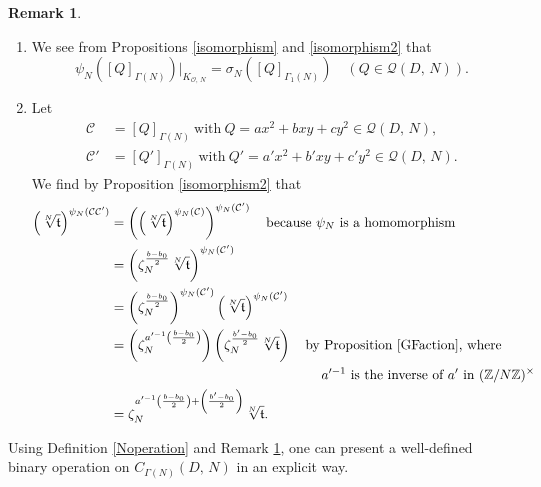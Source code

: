 \documentclass[reqno,11pt]{article}
\theoremstyle{plain} %
\theoremstyle{definition} %
\newtheorem{remark}[theorem]{\indent\sc Remark}
\begin{document}
\begin{remark}\label{operationremark}
\begin{enumerate}
\item[(i)] We see from Propositions \ref{isomorphism} and \ref{isomorphism2} that
\begin{equation*}
\psi_N([Q]_{\Gamma(N)})|_{K_{\mathcal{O},\,N}}=\sigma_N
([Q]_{\Gamma_1(N)})\quad(Q\in\mathcal{Q}(D,\,N)). 
\end{equation*}
\item[(ii)] Let 
\begin{align*}
\mathcal{C}&=[Q]_{\Gamma(N)}~\textrm{with}~
Q=ax^2+bxy+cy^2\in\mathcal{Q}(D,\,N),\\
\mathcal{C}'&=[Q']_{\Gamma(N)}~\textrm{with}~
Q'=a'x^2+b'xy+c'y^2\in\mathcal{Q}(D,\,N).
\end{align*}
We find by Proposition \ref{isomorphism2} that
\begin{align*}
\left(\sqrt[N]{\mathfrak{t}}\right)^{\psi_N(\mathcal{C}\mathcal{C}')}&=
\left(\left(\sqrt[N]{\mathfrak{t}}\right)^{\psi_N(\mathcal{C})}\right)
^{\psi_N(\mathcal{C}')}\quad\textrm{because $\psi_N$ is a homomorphism}\\
&=\left(\zeta_N^{\frac{b-b_0}{2}}\sqrt[N]{\mathfrak{t}}\right)
^{\psi_N(\mathcal{C}')}\\
&=\left(\zeta_N^{\frac{b-b_0}{2}}\right)^{\psi_N(\mathcal{C}')}\left(\sqrt[N]{\mathfrak{t}}\right)
^{\psi_N(\mathcal{C}')}\\
&=\left(\zeta_N^{a'^{-1}\left(\frac{b-b_0}{2}\right)}\right)
\left(\zeta_N^{\frac{b'-b_0}{2}}\sqrt[N]{\mathfrak{t}}\right)
\quad\textrm{by Proposition \ref{GFaction}, where}\\
&\hspace{5.5cm}\textrm{$a'^{-1}$ is the inverse of $a'$ in $(\mathbb{Z}/N\mathbb{Z})^\times$}\\
&=\zeta_N^{a'^{-1}\left(\frac{b-b_0}{2}\right)+\left(\frac{b'-b_0}{2}\right)}\sqrt[N]{\mathfrak{t}}. 
\end{align*}
\end{enumerate}
\end{remark}

Using Definition \ref{Noperation} and Remark \ref{operationremark}, one can present
a well-defined binary operation on $C_{\Gamma(N)}(D,\,N)$ in an explicit way. 
\end{document}
